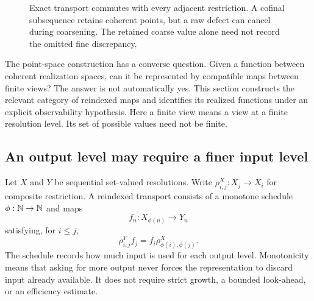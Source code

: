 \begin{figure}[htbp]\centering{}\caption{Exact transport commutes with every adjacent restriction. A cofinal subsequence retains coherent points, but a raw defect can cancel during coarsening. The retained coarse value alone need not record the omitted fine discrepancy.}\label{KS:fig:tower}\end{figure}


\label{KS:sec:observation}
The point-space construction has a converse question. Given a function between coherent realization spaces, can it be represented by compatible maps between finite views? The answer is not automatically yes. This section constructs the relevant category of reindexed maps and identifies its realized functions under an explicit observability hypothesis. Here a finite view means a view at a finite resolution level. Its set of possible values need not be finite.

\subsection{An output level may require a finer input level}
Let \(X\) and \(Y\) be sequential set-valued resolutions. Write \(\rho^X_{i,j}:X_j\to X_i\) for composite restriction. A reindexed transport consists of a monotone schedule \(\phi:\mathbb N\to\mathbb N\) and maps
\[
 f_n:X_{\phi(n)}\longrightarrow Y_n
\]
satisfying, for \(i\le j\),
\begin{equation}\label{KS:eq:scheduled-naturality}
 \rho^Y_{i,j}f_j=f_i\rho^X_{\phi(i),\phi(j)}.
\end{equation}
The schedule records how much input is used for each output level. Monotonicity means that asking for more output never forces the representation to discard input already available. It does not require strict growth, a bounded look-ahead, or an efficiency estimate.

